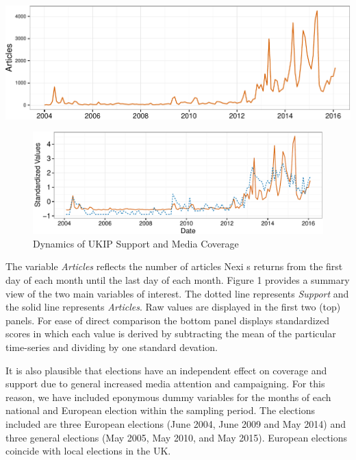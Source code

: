 \documentclass[12pt,]{article}
\makeatletter
\def\maxwidth{\ifdim\Gin@nat@width>\linewidth\linewidth
\else\Gin@nat@width\fi}
\let\Oldincludegraphics\includegraphics
\renewcommand{\includegraphics}[1]{\Oldincludegraphics[width=\maxwidth]{#1}}
\makeatother
\begin{document}
\includegraphics{ukip_media_files/figure-latex/unnamed-chunk-2-1.pdf}

\begin{figure}[htbp]
\centering
\includegraphics{ukip_media_files/figure-latex/unnamed-chunk-3-1.pdf}
\caption{Dynamics of UKIP Support and Media Coverage}
\end{figure}

\setlength\parindent{24pt}

The variable \emph{Articles} reflects the number of articles Nexi s
returns from the first day of each month until the last day of each
month. Figure 1 provides a summary view of the two main variables of
interest. The dotted line represents \emph{Support} and the solid line
represents \emph{Articles}. Raw values are displayed in the first two
(top) panels. For ease of direct comparison the bottom panel displays
standardized scores in which each value is derived by subtracting the
mean of the particular time-series and dividing by one standard
devation.

It is also plausible that elections have an independent effect on
coverage and support due to general increased media attention and
campaigning. For this reason, we have included eponymous dummy variables
for the months of each national and European election within the
sampling period. The elections included are three European elections
(June 2004, June 2009 and May 2014) and three general elections (May
2005, May 2010, and May 2015). European elections coincide with local
elections in the UK.
\end{document}
